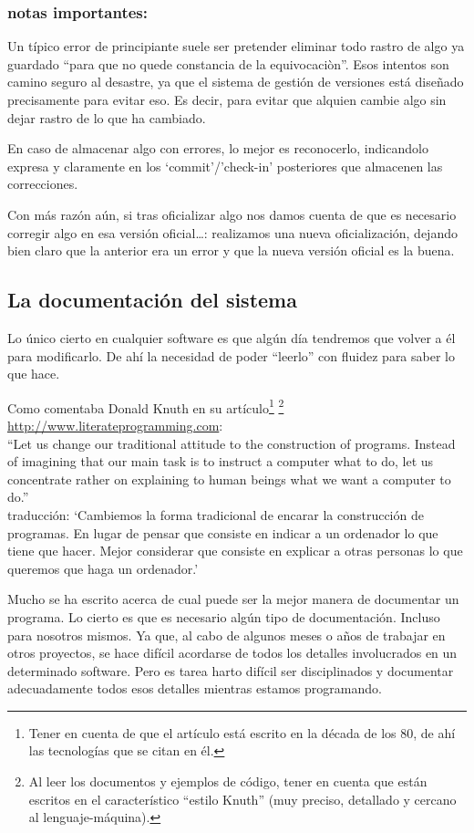 \documentclass[spanish,12pt,a4paper,final,oneside]{book}
\begin{document}
\subsubsection*{notas importantes:} 
Un  típico error de principiante suele ser pretender eliminar todo rastro de algo ya guardado ``para que no quede constancia de la equivocaciòn''. Esos intentos son camino seguro al desastre, ya que el sistema de gestión de versiones está diseñado precisamente para evitar eso. Es decir, para evitar que alquien cambie algo sin dejar rastro de lo que ha cambiado. 

En caso de almacenar algo con errores, lo mejor es reconocerlo, indicandolo expresa y claramente en los ‘commit’/’check-in’ posteriores que almacenen las correcciones.

Con más razón aún, si tras oficializar algo nos damos cuenta de que es necesario corregir algo en esa versión oficial…: realizamos una nueva oficialización, dejando bien claro que la anterior era un error y que la nueva versión oficial es la buena. 

\subsection{La documentación del sistema}
Lo único cierto en cualquier software es que algún día tendremos que volver a él para modificarlo. De ahí la necesidad de poder ``leerlo'' con fluidez para saber lo que hace.

Como comentaba Donald Knuth en su artículo\footnote{Tener en cuenta de que el artículo está escrito en la década de los 80, de ahí las tecnologías que se citan en él.}
\footnote{Al leer los documentos y ejemplos de código, tener en cuenta que están escritos en el característico ``estilo Knuth'' (muy preciso, detallado y cercano al lenguaje-máquina).}
 \url{http://www.literateprogramming.com}: 
\\``Let us change our traditional attitude to the construction of programs. Instead of imagining that our main task is to instruct a computer what to do, let us concentrate rather on explaining to human beings what we want a computer to do.''
\\traducción: ‘Cambiemos la forma tradicional de encarar la construcción de programas. En lugar de pensar que consiste en indicar a un ordenador lo que tiene que hacer. Mejor considerar que consiste en explicar a otras personas lo que queremos que haga un ordenador.’

Mucho se ha escrito acerca de cual puede ser la mejor manera de documentar un programa. Lo cierto es que es necesario algún tipo de documentación. Incluso para nosotros mismos. Ya que, al cabo de algunos meses o años de trabajar en otros proyectos, se hace difícil acordarse de todos los detalles involucrados en un determinado software. Pero es tarea harto difícil ser disciplinados y documentar adecuadamente todos esos detalles mientras estamos programando.
\end{document}
